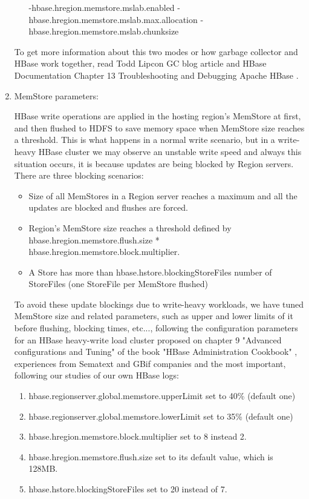 \begin{enumerate}
\begin{enumerate}
\par
{}
-hbase.hregion.memstore.mslab.enabled	
-hbase.hregion.memstore.mslab.max.allocation
-hbase.hregion.memstore.mslab.chunksize
\end{enumerate}


To get more information about this two modes or how garbage collector and HBase work together, read Todd Lipcon GC blog article \cite{MSLABexplained} and HBase Documentation Chapter 13 Troubleshooting and Debugging Apache HBase \cite{ApacheHBaseLogs}.

\item MemStore parameters:

HBase write operations are applied in the hosting region's MemStore at first, and then flushed to HDFS to save memory space when MemStore size reaches a threshold. This is what happens in a normal write scenario, but in a write-heavy HBase cluster we may observe an unstable write speed and always this situation occurs, it is because updates are being blocked by Region servers. There are three blocking scenarios:
\begin{itemize}
\item Size of all MemStores in a Region server reaches a maximum and all the updates are blocked and flushes are forced.
\item Region's MemStore size reaches a threshold defined by hbase.hregion.memstore.flush.size * hbase.hregion.memstore.block.multiplier.
\item A Store has more than hbase.hstore.blockingStoreFiles number of StoreFiles (one StoreFile per MemStore flushed)
\end{itemize}

To avoid these update blockings due to write-heavy workloads, we have tuned MemStore size and related parameters, such as upper and lower limits of it before flushing, blocking times, etc..., following the configuration parameters for an HBase heavy-write load cluster  proposed on chapter 9 "Advanced configurations and Tuning" of the book "HBase Administration Cookbook" \cite{jiang2012hbase}, experiences from Sematext \cite{MemstoreSematext} and GBif companies \cite{MemstoreGBif} and the most important, following our studies of our own HBase logs:
\\
\begin{enumerate}
\item hbase.regionserver.global.memstore.upperLimit set to 40\% (default one)
\item hbase.regionserver.global.memstore.lowerLimit set to 35\% (default one)
\item hbase.hregion.memstore.block.multiplier set to 8 instead 2.
\item hbase.hregion.memstore.flush.size set to its default value, which is 128MB.
\item hbase.hstore.blockingStoreFiles set to 20 instead of 7.
\end{enumerate}


\end{enumerate}
